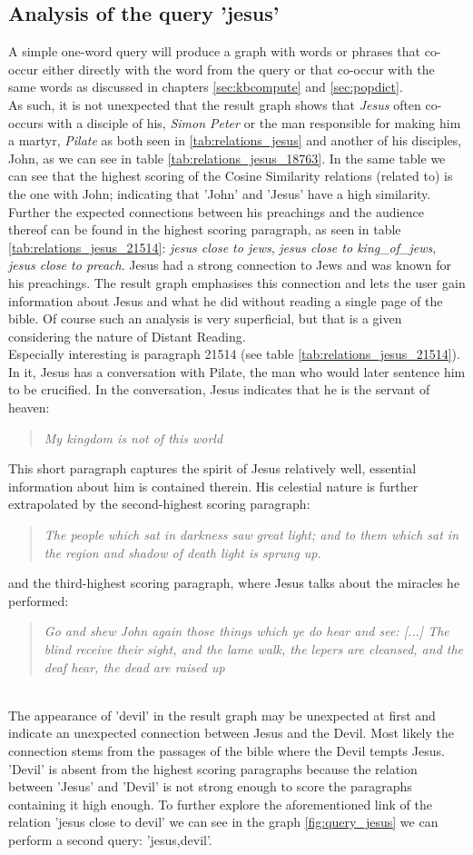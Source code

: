 \subsection{Analysis of the query 'jesus'}
\label{subsec:interpretation_jesus}
A simple one-word query will produce a graph with words or phrases that co-occur either directly with the word from the query or that co-occur with the same words as discussed in chapters \ref{sec:kbcompute} and \ref{sec:popdict}.\\
As such, it is not unexpected that the result graph shows that \textit{Jesus} often co-occurs with a disciple of his, \textit{Simon Peter} or the man responsible for making him a martyr, \textit{Pilate} as both seen in \ref{tab:relations_jesus} and another of his disciples, John, as we can see in table \ref{tab:relations_jesus_18763}. In the same table we can see that the highest scoring of the Cosine Similarity relations (related to) is the one with John; indicating that 'John' and 'Jesus' have a high similarity. Further the expected connections between his preachings and the audience thereof can be found in the highest scoring paragraph, as seen in table \ref{tab:relations_jesus_21514}: \textit{jesus close to jews}, \textit{jesus close to king\_of\_jews}, \textit{jesus close to preach}. Jesus had a strong connection to Jews and was known for his preachings. The result graph emphasises this connection and lets the user gain information about Jesus and what he did without reading a single page of the bible. Of course such an analysis is very superficial, but that is a given considering the nature of Distant Reading.\\
Especially interesting is paragraph 21514 (see table \ref{tab:relations_jesus_21514}). In it, Jesus has a conversation with Pilate, the man who would later sentence him to be crucified. In the conversation, Jesus indicates that he is the servant of heaven: \blockquote{\textit{My kingdom is not of this world}}. This short paragraph captures the spirit of Jesus relatively well, essential information about him is contained therein. His celestial nature is further extrapolated by the second-highest scoring paragraph: \blockquote{\textit{The people which sat in darkness saw great light; and to them which sat in the region and shadow of death light is sprung up.}} and the third-highest scoring paragraph, where Jesus talks about the miracles he performed: \blockquote{\textit{Go and shew John again those things which ye do hear and see:  [...] The blind receive their sight,  and the lame walk, the lepers are cleansed, and the deaf hear, the dead are raised up}}.\\
The appearance of 'devil' in the result graph may be unexpected at first and indicate an unexpected connection between Jesus and the Devil. Most likely the connection stems from the passages of the bible where the Devil tempts Jesus. 'Devil' is absent from the highest scoring paragraphs because the relation between 'Jesus' and 'Devil' is not strong enough to score the paragraphs containing it high enough. To further explore the aforementioned link of the relation 'jesus close to devil' we can see in the graph \ref{fig:query_jesus} we can perform a second query: 'jesus,devil'.

